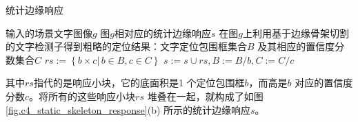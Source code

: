         \begin{algorithm} \renewcommand{\algorithmicrequire}{\textbf{输入:}}	\renewcommand{\algorithmicensure}{\textbf{输出:}}
    	\caption{统计边缘响应}
    	\label{alg:c4_static_skeleton_response}
    	\begin{algorithmic}[1]
    		\REQUIRE 输入的场景文字图像$g$
    		\ENSURE 图$g$相对应的统计边缘响应$s$
            \STATE 在图$g$上利用基于边缘骨架切割的文字检测子得到粗略的定位结果：文字定位包围框集合$B$ 及其相应的置信度分数集合$C$
    		\REPEAT
            \STATE $rs:=\left\{ b \times c  |\,b \in B, c \in C\right\}$
            \STATE $s:=s\cup rs,B:=B / b,C:=C / c$
    	\end{algorithmic}
        \end{algorithm}

        其中$rs$指代的是响应小块，它的底面积是1 个定位包围框$b$，而高是$b$ 对应的置信度分数$c$。将所有的这些响应小块$rs$ 堆叠在一起，就构成了如图\ref{fig.c4_static_skeleton_response}(b) 所示的统计边缘响应$s$。

